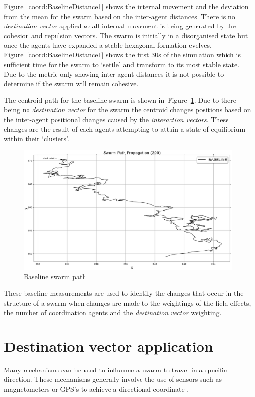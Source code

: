 Figure~\ref{coord:BaselineDistance1} shows the internal movement and the deviation from the mean for the swarm based on the inter-agent distances. There is no \textit{destination vector} applied so all internal movement is being generated by the cohesion and repulsion vectors. The swarm is initially in a disorganised state but once the agents have expanded a stable hexagonal formation evolves. Figure~\ref{coord:BaselineDistance1} shows the first 30s of the simulation which is sufficient time for the swarm to `settle' and transform to its most stable state. Due to the metric only showing inter-agent distances it is not possible to determine if the swarm will remain cohesive.

The centroid path for the baseline swarm is shown in~Figure~\ref{coord:SwarmPathBaseline1}. Due to there being no \textit{destination vector} for the swarm the centroid changes positions based on the inter-agent positional changes caused by the \textit{interaction vectors}. These changes are the result of each agents attempting to attain a state of equilibrium within their `clusters'.

\begin{figure}[H]
\begin{center}
\includegraphics[width=14cm]{CHAPTER-6/figures/SwarmPathBaseline}
\end{center}
\caption{Baseline swarm path\label{coord:SwarmPathBaseline1}}
\end{figure}

These baseline measurements are used to identify the changes that occur in the structure of a swarm when changes are made to the weightings of the field effects, the number of coordination agents and the \textit{destination vector} weighting.

\section{Destination vector application}
Many mechanisms can be used to influence a swarm to travel in a specific direction. These mechanisms generally involve the use of sensors such as magnetometers or GPS's to achieve a directional coordinate \cite{SG:15,TG:12}. 

